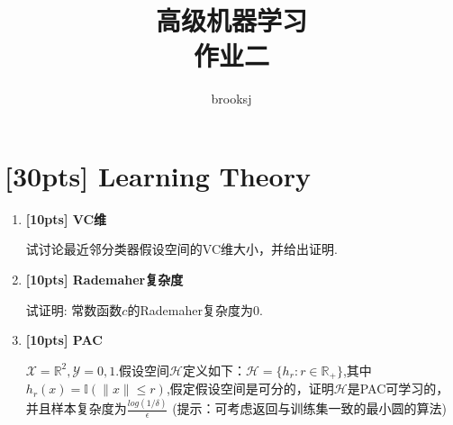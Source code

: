 \documentclass[a4paper,UTF8]{article}
\numberwithin{equation}{section}
\begin{document}
\graphicspath{{image/}}
\title{高级机器学习\\
作业二}
\author{brooksj}
\maketitle

\section{[30pts] Learning Theory}
\begin{enumerate}[(1)]
	\item \textbf{[10pts] VC维} 

	试讨论最近邻分类器假设空间的VC维大小，并给出证明.
	\item \textbf{[10pts] Rademaher复杂度}
	
	试证明: 常数函数$c$的Rademaher复杂度为$0$.
	\item \textbf{[10pts] PAC} 
	
	$\mathcal{X}=\mathbb{R}^2, \mathcal{Y}= {0,1}.$假设空间$\mathcal{H}$定义如下：$\mathcal{H}=\{h_r:r \in \mathbb{R}_+\}$,其中$h_r (x)=\mathbb{I}(\parallel x \parallel \leq r)$,假定假设空间是可分的，证明$\mathcal{H}$是PAC可学习的，并且样本复杂度为$\frac{log(1/\delta)}{\epsilon}$
	\newline
	(提示：可考虑返回与训练集一致的最小圆的算法)
\end{enumerate}
\end{document}

